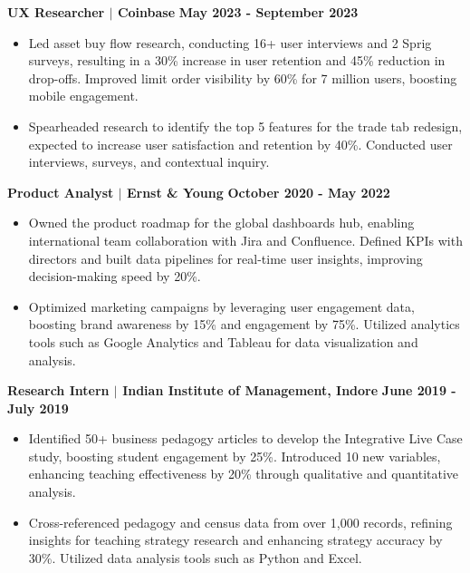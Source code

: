 \documentclass{article}
\begin{document}
\noindent \textbf{UX Researcher $\mid$ Coinbase} 
\hfill \textbf{May 2023 - September 2023}
\begin{itemize}[noitemsep,nolistsep,leftmargin=*]
    \item Led asset buy flow research, conducting 16+ user interviews and 2 Sprig surveys, resulting in a 30\% increase in user retention and 45\% reduction in drop-offs. Improved limit order visibility by 60\% for 7 million users, boosting mobile engagement.
    \item Spearheaded research to identify the top 5 features for the trade tab redesign, expected to increase user satisfaction and retention by 40\%. Conducted user interviews, surveys, and contextual inquiry.
\end{itemize}

\vspace{1mm}

\noindent \textbf{Product Analyst $\mid$ Ernst \& Young} 
\hfill \textbf{October 2020 - May 2022}
\begin{itemize}[noitemsep,nolistsep,leftmargin=*]
    \item Owned the product roadmap for the global dashboards hub, enabling international team collaboration with Jira and Confluence. Defined KPIs with directors and built data pipelines for real-time user insights, improving decision-making speed by 20\%.
    \item Optimized marketing campaigns by leveraging user engagement data, boosting brand awareness by 15\% and engagement by 75\%. Utilized analytics tools such as Google Analytics and Tableau for data visualization and analysis.
\end{itemize}

\vspace{1mm}

\noindent \textbf{Research Intern $\mid$ Indian Institute of Management, Indore} 
\hfill \textbf{June 2019 - July 2019}
\begin{itemize}[noitemsep,nolistsep,leftmargin=*]
    \item Identified 50+ business pedagogy articles to develop the Integrative Live Case study, boosting student engagement by 25\%. Introduced 10 new variables, enhancing teaching effectiveness by 20\% through qualitative and quantitative analysis.
    \item Cross-referenced pedagogy and census data from over 1,000 records, refining insights for teaching strategy research and enhancing strategy accuracy by 30\%. Utilized data analysis tools such as Python and Excel.
\end{itemize}
\end{document}
